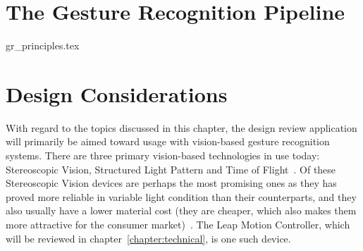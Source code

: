 \section{The Gesture Recognition Pipeline}
\label{sec:gr_principles}
{gr_principles.tex}


\section{Design Considerations}
\label{sec:gesture_design_considerations}
With regard to the topics discussed in this chapter, the design review application will primarily be aimed toward usage with vision-based gesture recognition
systems. There are three primary vision-based technologies in use today: Stereoscopic Vision, Structured Light Pattern and Time of Flight~\citep{Ko2012}.
Of these Stereoscopic Vision devices are perhaps the most promising ones as they has proved more reliable in variable light condition than their counterparts, and they 
also usually have a lower material cost (they are cheaper, which also makes them more attractive for the consumer market)~\citep{Ko2012}. 
The Leap Motion Controller, which will be reviewed in chapter~\ref{chapter:technical}, is one such device. 
 




